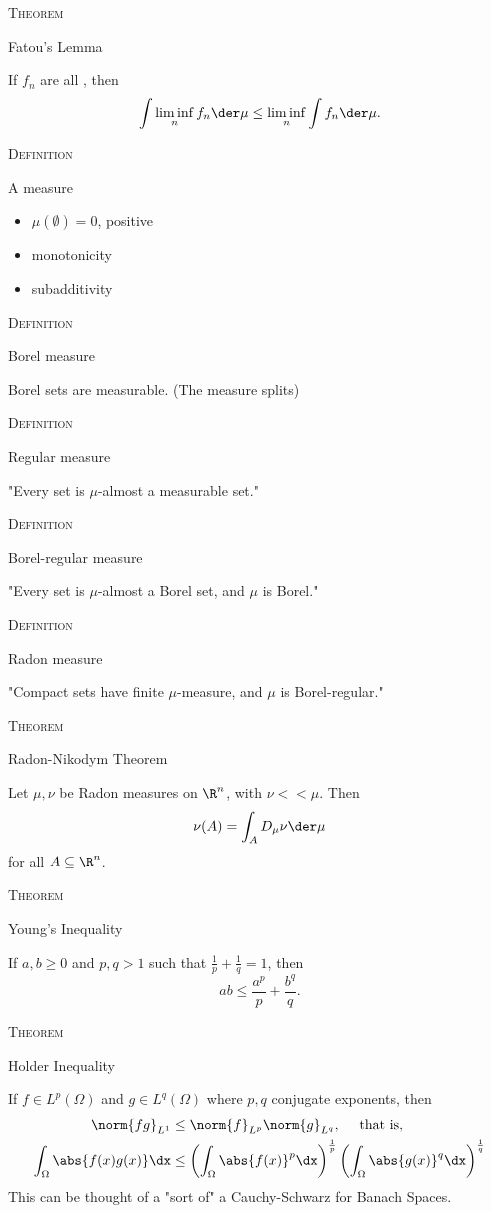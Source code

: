 \documentclass{article}
\newenvironment{flashcard}[2][]{%
\noindent  \textsc{#1}

\vfill 
\centerline{{\Large{#2}}}
\vfill
\newpage \vspace*{\stretch{1}} \noindent
}
{\vspace*{\stretch{1}}\newpage}
\begin{document}
\begin{flashcard}[Theorem]{Fatou's Lemma}
If $f_n$ are all \mumeasurable{}, then 
$$\int\liminf_n f_n \der\mu \leq \liminf_n \int f_n \der\mu.$$
\end{flashcard}

\begin{flashcard}[Definition]{A measure}
\begin{itemize}
\item $\mu(\emptyset)=0$, positive
\item monotonicity
\item subadditivity
\end{itemize}
\end{flashcard}

\begin{flashcard}[Definition]{Borel measure}
Borel sets are measurable. (The measure splits)
\end{flashcard}

\begin{flashcard}[Definition]{Regular measure}
"Every set is $\mu$-almost a measurable set."
\end{flashcard}

\begin{flashcard}[Definition]{Borel-regular measure}
"Every set is $\mu$-almost a Borel set, and $\mu$ is Borel."
\end{flashcard}

\begin{flashcard}[Definition]{Radon measure}
"Compact sets have finite $\mu$-measure, and $\mu$ is Borel-regular."
\end{flashcard}

\begin{flashcard}[Theorem]{Radon-Nikodym Theorem}
Let $\mu, \nu$ be Radon measures on $\R^n$, with $\nu<<\mu$. Then 
$$\nu(A)=\int_A D_\mu \nu \der\mu$$
for all \mumeasurable{} $A\subseteq\R^n$. 
\end{flashcard}

\begin{flashcard}[Theorem]{Young's Inequality}
If $a,b\geq0$ and $p,q>1$ such that $\frac{1}{p}+\frac{1}{q}=1$, then 
$$ab\leq \frac{a^p}{p}+\frac{b^q}{q}.$$
\end{flashcard}

\begin{flashcard}[Theorem]{Holder Inequality}
If $f\in L^p(\Omega)$ and $g\in L^q(\Omega)$ where $p,q$ conjugate exponents, then 
\begin{align*}
\norm{fg}_{L^1}&\leq \norm{f}_{L^p} \norm{g}_{L^q}, \quad \text{ that is, } \\
\int_\Omega \abs{f(x)g(x)}\dx &\leq \left(\int_\Omega \abs{f(x)}^p\dx\right)^{\frac{1}{p}} \left(\int_\Omega \abs{g(x)}^q\dx\right)^{\frac{1}{q}}
\end{align*}
This can be thought of a "sort of" a Cauchy-Schwarz for Banach Spaces.
\end{flashcard}
\end{document}
